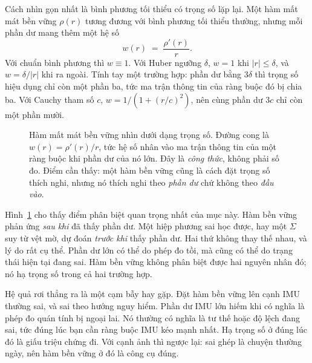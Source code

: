 \documentclass[../../deep_learning.tex]{subfiles}
\begin{document}
Cách nhìn gọn nhất là bình phương tối thiểu có trọng số lặp lại. Một hàm mất mát bền vững \(\rho(r)\) tương đương với bình phương tối thiểu thường, nhưng mỗi phần dư mang thêm một hệ số
\[
w(r) \;=\; \frac{\rho'(r)}{r} .
\]
Với chuẩn bình phương thì \(w \equiv 1\). Với Huber ngưỡng \(\delta\), \(w = 1\) khi \(|r| \le \delta\), và \(w = \delta/|r|\) khi ra ngoài. Tính tay một trường hợp: phần dư bằng \(3\delta\) thì trọng số hiệu dụng chỉ còn một phần ba, tức ma trận thông tin của ràng buộc đó bị chia ba. Với Cauchy tham số \(c\), \(w = 1/(1+(r/c)^2)\), nên cùng phần dư \(3c\) chỉ còn một phần mười.

\begin{figure}[H]\centering
{}
\caption{Hàm mất mát bền vững nhìn dưới dạng trọng số. Đường cong là \(w(r)=\rho'(r)/r\), tức hệ số nhân vào ma trận thông tin của một ràng buộc khi phần dư của nó lớn. Đây là \emph{công thức}, không phải số đo. Điểm cần thấy: một hàm bền vững cũng là cách đặt trọng số thích nghi, nhưng nó thích nghi theo \emph{phần dư} chứ không theo \emph{đầu vào}.}
\label{fig:f34-ham-ben-vung}
\end{figure}

Hình~\ref{fig:f34-ham-ben-vung} cho thấy điểm phân biệt quan trọng nhất của mục này. Hàm bền vững phản ứng \emph{sau khi} đã thấy phần dư. Một hiệp phương sai học được, hay một \(\Sigma\) suy từ vệt mờ, dự đoán \emph{trước khi} thấy phần dư. Hai thứ không thay thế nhau, và lý do rất cụ thể. Phần dư lớn có thể do phép đo tồi, mà cũng có thể do trạng thái hiện tại đang sai. Hàm bền vững không phân biệt được hai nguyên nhân đó; nó hạ trọng số trong cả hai trường hợp.

Hệ quả rơi thẳng ra là một cạm bẫy hay gặp. Đặt hàm bền vững lên cạnh IMU thường sai, và sai theo hướng nguy hiểm. Phần dư IMU lớn hiếm khi có nghĩa là phép đo quán tính bị ngoại lai. Nó thường có nghĩa là tư thế hoặc độ lệch đang sai, tức đúng lúc bạn cần ràng buộc IMU kéo mạnh nhất. Hạ trọng số ở đúng lúc đó là giấu triệu chứng đi. Với cạnh ảnh thì ngược lại: sai ghép là chuyện thường ngày, nên hàm bền vững ở đó là công cụ đúng.
\end{document}
